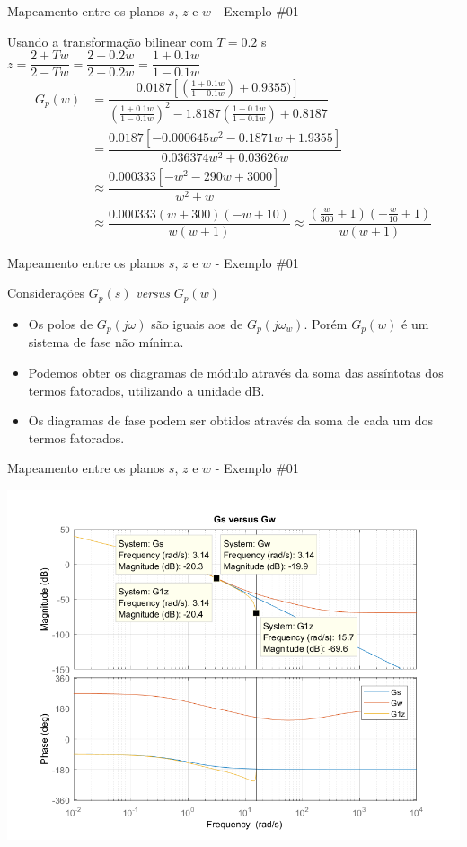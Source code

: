 \begin{frame}{Mapeamento entre os planos $s$, $z$ e $w$ - Exemplo \#01}
	\begin{block}{Usando a transformação bilinear com $T = \num{0,2}$ s}
	\centering
	   $ z = \dfrac{2 + Tw}{2 - Tw} = \dfrac{2 + \num{0,2}w}{2 - \num{0,2}w} = \dfrac{1 + \num{0,1}w}{1 - \num{0,1}w} $
	\begin{align*}
		G_p(w)&=\dfrac{\num{0,0187}\left[\left(\frac{1 + \num{0,1}w}{1 - \num{0,1}w}\right) + \num{0,9355})\right]}{\left(\frac{1 + \num{0,1}w}{1 - \num{0,1}w}\right)^2 - \num{1,8187}\left(\frac{1 + \num{0,1}w}{1 - \num{0,1}w}\right) + \num{0,8187}}\\
		&=\dfrac{\num{0,0187}[-\num{0,000645}w^2 - \num{0,1871}w + \num{1,9355}]}{\num{0,036374}w^2 + \num{0,03626}w} \\
		&\approx \dfrac{\num{0,000333}[-w^2 -290w + 3000]}{w^2 + w} \\
		&\approx \dfrac{\num{0,000333}(w + 300)(-w + 10)}{w(w + 1)} \approx \dfrac{\left(\frac{w}{300} + 1\right) \left(-\frac{w}{10} + 1\right)}{w(w + 1)}
		\end{align*}
	\end{block}
\end{frame}

\begin{frame}{Mapeamento entre os planos $s$, $z$ e $w$ - Exemplo \#01}
	\begin{block}{Considerações $G_p(s)$ \textit{versus} $G_p(w)$ }
	\begin{itemize}
	    \item Os polos de $G_p(j\omega)$ são iguais aos de $G_p(j\omega_w)$. Porém $G_p(w)$ é um sistema de fase não mínima. 
        \item Podemos obter os diagramas de módulo através da soma das assíntotas dos termos fatorados, utilizando a unidade dB. 
        \item Os diagramas de fase podem ser obtidos através da soma de cada um dos termos fatorados. 
	\end{itemize}
	\end{block}
\end{frame}

\begin{frame}{Mapeamento entre os planos $s$, $z$ e $w$ - Exemplo \#01}
\centerline{\includegraphics[width=0.85\linewidth]{Figuras/Ch13/fig8.png}}
\end{frame}

